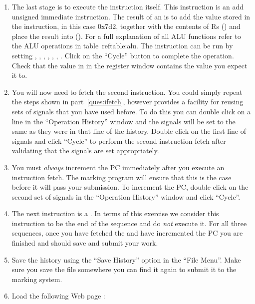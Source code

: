 \documentclass[a4paper,10pt]{article}
\begin{document}
\begin{enumerate}
\item The last stage is to execute the instruction itself. This
instruction is an add unsigned immediate instruction. The result of an
 is to add the value stored in the instruction, in this
case 0x7d2, together with the contents of Rs () and place
the result into \regd (). For a full explanation of all ALU
functions refer to the ALU operations in table~ref{table:alu}. The
instruction can be run by setting ,
, , ,
, , . Click on
the ``Cycle'' button to complete the operation. Check that the value
in  in the register window contains the value you expect
it to.

\item You will now need to fetch the second instruction. You could
simply repeat the steps shown in part~\ref{ques:ifetch}, however
 provides a facility for reusing sets of signals that
you have used before. To do this you can double click on a line in the
``Operation History'' window and the signals will be set to the same
as they were in that line of the history. Double click on the first
line of signals and click ``Cycle'' to perform the second instruction
fetch after validating that the signals are set appropriately.

\item You must \textit{always} increment the PC immediately after you
execute an instruction fetch. The marking program will ensure that
this is the case before it will pass your submission. To increment the
PC, double click on the second set of signals in the ``Operation
History'' window and click ``Cycle''.

\item The next instruction is a . In terms of this
exercise we consider this instruction to be the end of the sequence
and do \textit{not} execute it. For all three sequences, once you have
fetched the  and have incremented the PC you are
finished and should save and submit your work.

\item Save the history using the ``Save History'' option in the ``File
Menu''. Make sure you save the file somewhere you can find it again to
submit it to the marking system.

\item Load the following Web page :



\end{enumerate}
\end{document}
